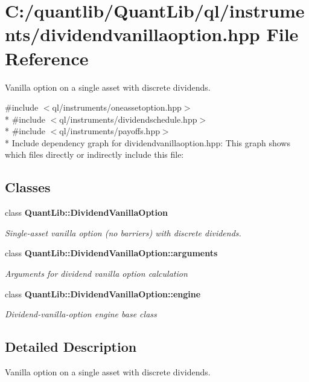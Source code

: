 \section{C\+:/quantlib/\+Quant\+Lib/ql/instruments/dividendvanillaoption.hpp File Reference}
\label{dividendvanillaoption_8hpp}


Vanilla option on a single asset with discrete dividends.  


{\ttfamily \#include $<$ql/instruments/oneassetoption.\+hpp$>$}\\*
{\ttfamily \#include $<$ql/instruments/dividendschedule.\+hpp$>$}\\*
{\ttfamily \#include $<$ql/instruments/payoffs.\+hpp$>$}\\*
Include dependency graph for dividendvanillaoption.\+hpp\+:
This graph shows which files directly or indirectly include this file\+:
\subsection*{Classes}
\begin{DoxyCompactItemize}
\item 
class {\bf Quant\+Lib\+::\+Dividend\+Vanilla\+Option}
\begin{DoxyCompactList}\small\item\em Single-\/asset vanilla option (no barriers) with discrete dividends. \end{DoxyCompactList}\item 
class {\bf Quant\+Lib\+::\+Dividend\+Vanilla\+Option\+::arguments}
\begin{DoxyCompactList}\small\item\em Arguments for dividend vanilla option calculation \end{DoxyCompactList}\item 
class {\bf Quant\+Lib\+::\+Dividend\+Vanilla\+Option\+::engine}
\begin{DoxyCompactList}\small\item\em Dividend-\/vanilla-\/option engine base class \end{DoxyCompactList}\end{DoxyCompactItemize}


\subsection{Detailed Description}
Vanilla option on a single asset with discrete dividends. 

